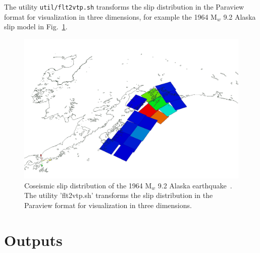 \documentclass[10pt]{article}
\begin{document}
The utility \verb'util/flt2vtp.sh' transforms the slip distribution in the Paraview format for visualization in three dimensions, for example the 1964 M$_w$ 9.2 Alaska slip model in Fig.~\ref{fig:alaska}.

%
\begin{figure}[h]
\centering
\includegraphics[width=\textwidth]{alaska.jpg}
\caption{\small Coseismic slip distribution of the 1964 M$_w$ 9.2 Alaska earthquake~\citep{johnson+96}. The utility 'flt2vtp.sh' transforms the slip distribution in the Paraview format for visualization in three dimensions.}
\label{fig:alaska}
\end{figure}
%




\pagebreak
\section{Outputs}
\end{document}
